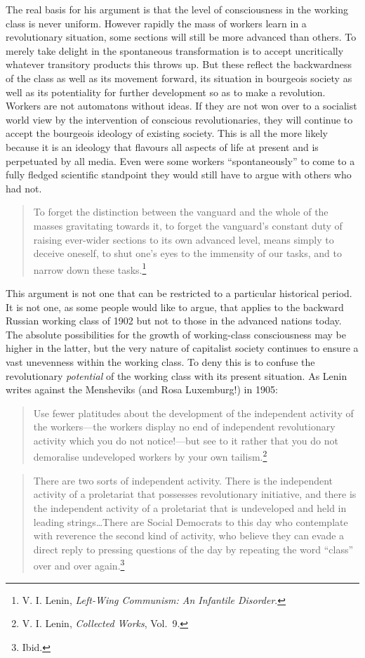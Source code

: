 The real basis for his argument is that the level of consciousness in the working class is never uniform. However rapidly the mass of workers learn in a revolutionary situation, some sections will still be more advanced than others. To merely take delight in the spontaneous transformation is to accept uncritically whatever transitory products this throws up. But these reflect the backwardness of the class as well as its movement forward, its situation in bourgeois society as well as its potentiality for further development so as to make a revolution. Workers are not automatons without ideas. If they are not won over to a socialist world view by the intervention of conscious revolutionaries, they will continue to accept the bourgeois ideology of existing society. This is all the more likely because it is an ideology that flavours all aspects of life at present and is perpetuated by all media. Even were some workers ``spontaneously'' to come to a fully fledged scientific standpoint they would still have to argue with others who had not.

\blockquote{To forget the distinction between the vanguard and the whole of the masses gravitating towards it, to forget the vanguard's constant duty of raising ever-wider sections to its own advanced level, means simply to deceive oneself, to shut one's eyes to the immensity of our tasks, and to narrow down these tasks.\footnote{V. I. Lenin, \emph{Left-Wing Communism: An Infantile Disorder}.}}

This argument is not one that can be restricted to a particular historical period. It is not one, as some people would like to argue, that applies to the backward Russian working class of 1902 but not to those in the advanced nations today. The absolute possibilities for the growth of working-class consciousness may be higher in the latter, but the very nature of capitalist society continues to ensure a vast unevenness within the working class. To deny this is to confuse the revolutionary \emph{potential} of the working class with its present situation. As Lenin writes against the Mensheviks (and Rosa Luxemburg!) in 1905:

\blockquote{Use fewer platitudes about the development of the independent activity of the workers---the workers display no end of independent revolutionary activity which you do not notice!---but see to it rather that you do not demoralise undeveloped workers by your own tailism.\footnote{V. I. Lenin, \emph{Collected Works}, Vol.~9.}}

\blockquote{There are two sorts of independent activity. There is the independent activity of a proletariat that possesses revolutionary initiative, and there is the independent activity of a proletariat that is undeveloped and held in leading strings\ldots There are Social Democrats to this day who contemplate with reverence the second kind of activity, who believe they can evade a direct reply to pressing questions of the day by repeating the word ``class'' over and over again.\footnote{Ibid.}}

